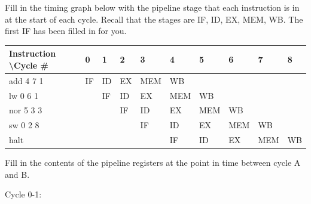 \documentclass[12pt, letterpaper]{article}
\begin{document}
\begin{subproblem}{}
    Fill in the timing graph below with the pipeline stage that each instruction is in at the start
of each cycle. Recall that the stages are IF, ID, EX, MEM, WB. The first IF has been
filled in for you.
\end{subproblem}
\begin{table}[H]
    \begin{tabular}{|l|l|l|l|l|l|l|l|l|l|}
    \hline
    Instruction \textbackslash Cycle \# & 0  & 1  & 2  & 3   & 4   & 5   & 6   & 7   & 8  \\ \hline
    add 4 7 1                           & IF & ID & EX & MEM & WB  &     &     &     &    \\ \hline
    lw 0 6 1                            &    & IF & ID & EX  & MEM & WB  &     &     &    \\ \hline
    nor 5 3 3                           &    &    & IF & ID  & EX  & MEM & WB  &     &    \\ \hline
    sw 0 2 8                            &    &    &    & IF  & ID  & EX  & MEM & WB  &    \\ \hline
    halt                                &    &    &    &     & IF  & ID  & EX  & MEM & WB \\ \hline
    \end{tabular}
\end{table}
\begin{subproblem}{}
    Fill in the contents of the pipeline registers at the point in time between cycle A and B.
\end{subproblem}
Cycle 0-1:
\end{document}
